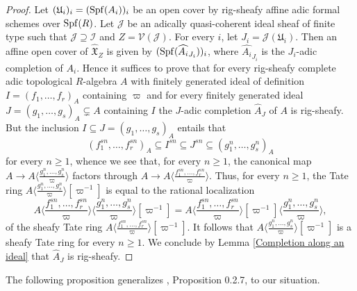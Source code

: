 \documentclass[12pt,twoside,a4paper]{article}
\theoremstyle{definition}
\theoremstyle{remark}
\newcommand\Spf{{\rm Spf}}
\begin{document}
\begin{proof}Let $(\mathfrak{U}_{i})_{i}=(\Spf(A_{i}))_{i}$ be an open cover by rig-sheafy affine adic formal schemes over $\Spf(R)$. Let $\mathcal{J}$ be an adically quasi-coherent ideal sheaf of finite type such that $\mathcal{J}\supseteq\mathcal{I}$ and $Z=\mathcal{V}(\mathcal{J})$. For every $i$, let $J_{i}=\mathcal{J}(\mathfrak{U}_{i})$. Then an affine open cover of $\widehat{\mathfrak{X}}_{Z}$ is given by $(\Spf(\widehat{A_{i}}_{J_{i}}))_{i}$, where $\widehat{A_{i}}_{J_{i}}$ is the $J_{i}$-adic completion of $A_{i}$. Hence it suffices to prove that for every rig-sheafy complete adic topological $R$-algebra $A$ with finitely generated ideal of definition $I=(f_1,\dots,f_r)_{A}$ containing $\varpi$ and for every finitely generated ideal $J=(g_1,\dots,g_s)_{A}\subsetneq A$ containing $I$ the $J$-adic completion $\widehat{A}_{J}$ of $A$ is rig-sheafy. But the inclusion $I\subseteq J=(g_1,\dots,g_s)_{A}$ entails that \begin{equation*}(f_1^{sn},\dots, f_r^{sn})_{A}\subseteq I^{sn}\subseteq J^{sn}\subseteq (g_1^{n},\dots, g_s^{n})_{A}\end{equation*}for every $n\geq1$, whence we see that, for every $n\geq1$, the canonical map $A\to A\langle\frac{g_1^{n},\dots,g_s^{n}}{\varpi}\rangle$ factors through $A\to A\langle\frac{f_1^{sn},\dots,f_r^{sn}}{\varpi}\rangle$. Thus, for every $n\geq1$, the Tate ring $A\langle\frac{g_1^{n},\dots,g_s^{n}}{\varpi}\rangle[\varpi^{-1}]$ is equal to the rational localization\begin{equation*}A\langle\frac{f_1^{sn},\dots,f_r^{sn}}{\varpi}\rangle\langle\frac{g_1^{n},\dots,g_s^{n}}{\varpi}\rangle[\varpi^{-1}]=A\langle\frac{f_1^{sn},\dots,f_r^{sn}}{\varpi}\rangle[\varpi^{-1}]\langle\frac{g_1^{n},\dots,g_s^{n}}{\varpi}\rangle,\end{equation*}of the sheafy Tate ring $A\langle\frac{f_1^{sn},\dots,f_r^{sn}}{\varpi}\rangle[\varpi^{-1}]$. It follows that $A\langle\frac{g_1^{n},\dots,g_s^{n}}{\varpi}\rangle[\varpi^{-1}]$ is a sheafy Tate ring for every $n\geq1$. We conclude by Lemma \ref{Completion along an ideal} that $\widehat{A}_{J}$ is rig-sheafy.\end{proof}
The following proposition generalizes \cite{Berthelot96}, Proposition 0.2.7, to our situation.
\end{document}
